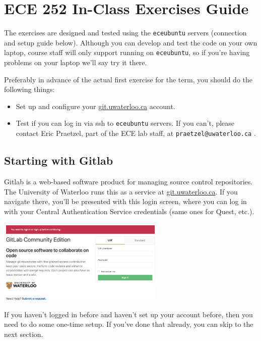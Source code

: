 



\section*{ECE 252 In-Class Exercises Guide}

The exercises are designed and tested using the \texttt{eceubuntu} servers (connection and setup guide below). Although you can develop and test the code on your own laptop, course staff will only support running on \texttt{eceubuntu}, so if you're having problems on your laptop we'll say try it there.

Preferably in advance of the actual first exercise for the term, you should do the following things:
\begin{itemize}
	\item Set up and configure your \url{git.uwaterloo.ca} account.
	\item Test if you can log in via ssh to \texttt{eceubuntu} servers. If you can't, please contact Eric Praetzel, part of the ECE lab staff,  at \texttt{praetzel@uwaterloo.ca} .
\end{itemize}

\subsection*{Starting with Gitlab}
Gitlab is a web-based software product for managing source control repositories. The University of Waterloo runs this as a service at \url{git.uwaterloo.ca}. If you navigate there, you'll be presented with this login screen, where you can log in with your Central Authentication Service credentials (same ones for Quest, etc.).

\begin{center}
	\includegraphics[width=0.6\textwidth]{images/gitlab-login.png}
\end{center}

If you haven't logged in before and haven't set up your account before, then you need to do some one-time setup. If you've done that already, you can skip to the next section.


